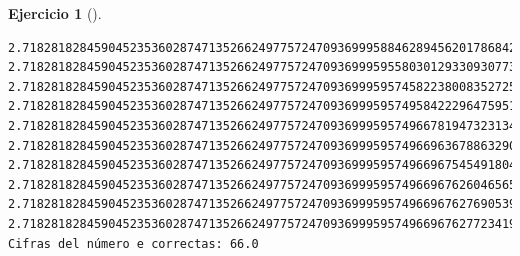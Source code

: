 \documentclass[
  a4paper,
]{scrreport}
\theoremstyle{definition}
\newtheorem{exercise}{Ejercicio}[chapter]
\theoremstyle{remark}
\begin{document}
\begin{exercise}[]
\begin{tcolorbox}
\begin{verbatim}
2.718281828459045235360287471352662497757247093699958846289456201786842269068718, 2.718281828459045235360287471352662497757247093699959558030129330930773409335862, 2.718281828459045235360287471352662497757247093699959574582238008352725296318806, 2.71828182845904523536028747135266249775724709369995957495842229647595147556844, 2.718281828459045235360287471352662497757247093699959574966781947323134279551751, 2.718281828459045235360287471352662497757247093699959574966963678863290427464427, 2.718281828459045235360287471352662497757247093699959574966967545491804388058332, 2.718281828459045235360287471352662497757247093699959574966967626046565095570662, 2.718281828459045235360287471352662497757247093699959574966967627690539803887274, 2.718281828459045235360287471352662497757247093699959574966967627723419298053591]
Cifras del número e correctas: 66.0
\end{verbatim}

\end{tcolorbox}

\end{exercise}
\end{document}
